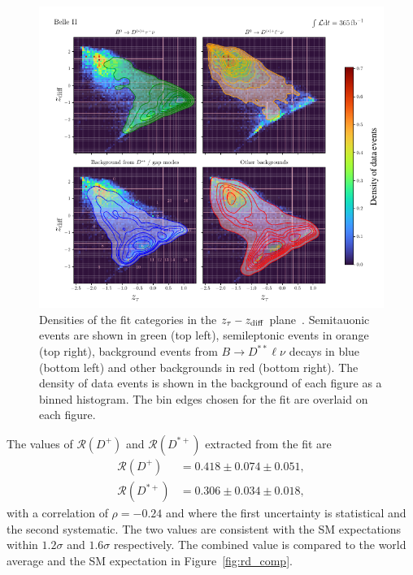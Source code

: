\documentclass{moriond}
\def\bea{\begin{eqnarray}}
\def\eea{\end{eqnarray}}
\def\zdiff{z_{\rm diff}}
\def\rdp{\mathcal{R}\left(D^+\right)}
\def\rdstp{\mathcal{R}\left(D^{*+}\right)}
\begin{document}
\begin{figure}[h!]
    \centering
    \includegraphics[scale=0.8]{Figures/2d_rd.pdf}
    \caption{Densities of the fit categories in the $z_\tau-\zdiff$ plane~\cite{alina}. Semitauonic events are shown in green (top left), semileptonic events in orange (top right), background events from $B \to D^{**}\ell\nu$ decays in blue (bottom left) and other backgrounds in red (bottom right). The density of data events is shown in the background of each figure as a binned histogram. The bin edges chosen for the fit are overlaid on each figure.}
    \label{fig:2d_rd}
\end{figure}
The values of $\rdp$ and $\rdstp$ extracted from the fit are
\bea
    \rdp &= 0.418 \pm 0.074 \pm 0.051, \\
    \rdstp &= 0.306 \pm 0.034 \pm 0.018,
\eea
with a correlation of $\rho = -0.24$ and where the first uncertainty is statistical and the second systematic. The two values are consistent with the SM expectations within $1.2\sigma$ and $1.6\sigma$ respectively. The combined value is compared to the world average and the SM expectation in Figure~\ref{fig:rd_comp}.
\end{document}
